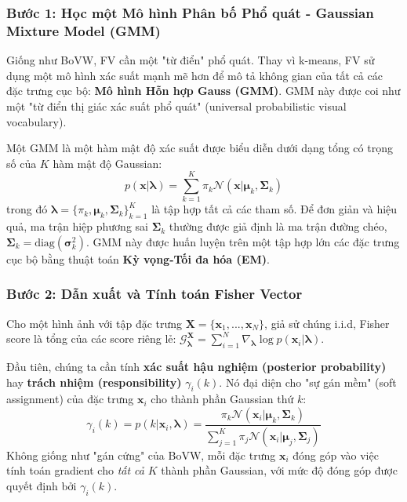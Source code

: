 \subsubsection{Bước 1: Học một Mô hình Phân bố Phổ quát - Gaussian Mixture Model (GMM)}
\label{subsubsec:fv_gmm_detailed}
Giống như BoVW, FV cần một "từ điển" phổ quát. Thay vì k-means, FV sử dụng một mô hình xác suất mạnh mẽ hơn để mô tả không gian của tất cả các đặc trưng cục bộ: \textbf{Mô hình Hỗn hợp Gauss (GMM)}. GMM này được coi như một "từ điển thị giác xác suất phổ quát" (universal probabilistic visual vocabulary).

Một GMM là một hàm mật độ xác suất được biểu diễn dưới dạng tổng có trọng số của $K$ hàm mật độ Gaussian:
\begin{equation}
    p(\mathbf{x} | \boldsymbol{\lambda}) = \sum_{k=1}^{K} \pi_k \mathcal{N}(\mathbf{x} | \boldsymbol{\mu}_k, \boldsymbol{\Sigma}_k)
\end{equation}
trong đó $\boldsymbol{\lambda} = \{\pi_k, \boldsymbol{\mu}_k, \boldsymbol{\Sigma}_k\}_{k=1}^K$ là tập hợp tất cả các tham số. Để đơn giản và hiệu quả, ma trận hiệp phương sai $\boldsymbol{\Sigma}_k$ thường được giả định là ma trận đường chéo, $\boldsymbol{\Sigma}_k = \text{diag}(\boldsymbol{\sigma}_k^2)$. GMM này được huấn luyện trên một tập hợp lớn các đặc trưng cục bộ bằng thuật toán \textbf{Kỳ vọng-Tối đa hóa (EM)}.

\subsubsection{Bước 2: Dẫn xuất và Tính toán Fisher Vector}
\label{subsubsec:fv_derivation_detailed}
Cho một hình ảnh với tập đặc trưng $\mathbf{X} = \{\mathbf{x}_1, ..., \mathbf{x}_N\}$, giả sử chúng i.i.d, Fisher score là tổng của các score riêng lẻ: $\mathcal{G}_{\boldsymbol{\lambda}}^{\mathbf{X}} = \sum_{i=1}^{N} \nabla_{\boldsymbol{\lambda}} \log p(\mathbf{x}_i|\boldsymbol{\lambda})$.

Đầu tiên, chúng ta cần tính \textbf{xác suất hậu nghiệm (posterior probability)} hay \textbf{trách nhiệm (responsibility)} $\gamma_i(k)$. Nó đại diện cho "sự gán mềm" (soft assignment) của đặc trưng $\mathbf{x}_i$ cho thành phần Gaussian thứ $k$:
\begin{equation}
    \gamma_i(k) = p(k | \mathbf{x}_i, \boldsymbol{\lambda}) = \frac{\pi_k \mathcal{N}(\mathbf{x}_i | \boldsymbol{\mu}_k, \boldsymbol{\Sigma}_k)}{\sum_{j=1}^{K} \pi_j \mathcal{N}(\mathbf{x}_i | \boldsymbol{\mu}_j, \boldsymbol{\Sigma}_j)}
\end{equation}
Không giống như "gán cứng" của BoVW, mỗi đặc trưng $\mathbf{x}_i$ đóng góp vào việc tính toán gradient cho \textit{tất cả} $K$ thành phần Gaussian, với mức độ đóng góp được quyết định bởi $\gamma_i(k)$.

